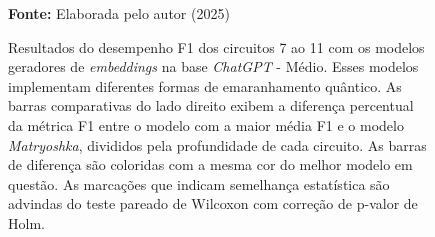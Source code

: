\begin{figure}
\caption{Resultados do desempenho F1 dos circuitos 7 ao 11 com os modelos geradores de \textit{embeddings} na base \textit{ChatGPT} - Médio. Esses modelos implementam diferentes formas de emaranhamento quântico. As barras comparativas do lado direito exibem a diferença percentual da métrica F1 entre o modelo com a maior média F1 e o modelo \textit{Matryoshka}, divididos pela profundidade de cada circuito. As barras de diferença são coloridas com a mesma cor do melhor modelo em questão. As marcações que indicam semelhança estatística são advindas do teste pareado de Wilcoxon com correção de p-valor de Holm.}
\label{fig:model_transformer:medium:g2}
     \centering
    \centering

      \par\medskip\ABNTEXfontereduzida\selectfont\textbf{Fonte:} Elaborada pelo autor (2025) \par\medskip
\end{figure}